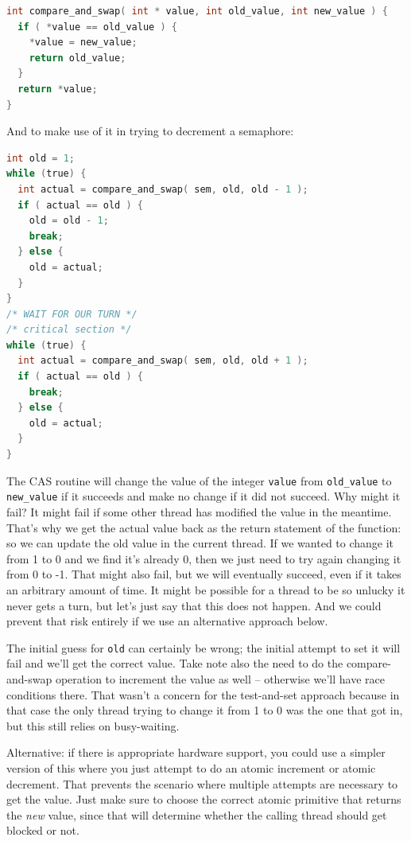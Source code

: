 \begin{lstlisting}[language=C]
int compare_and_swap( int * value, int old_value, int new_value ) {
  if ( *value == old_value ) {
    *value = new_value;
    return old_value;
  }
  return *value;
}
\end{lstlisting}

And to make use of it in trying to decrement a semaphore:

\begin{lstlisting}[language=C]
int old = 1;
while (true) {
  int actual = compare_and_swap( sem, old, old - 1 );
  if ( actual == old ) {
    old = old - 1;
    break;
  } else {
    old = actual;
  }
}
/* WAIT FOR OUR TURN */
/* critical section */
while (true) {
  int actual = compare_and_swap( sem, old, old + 1 );
  if ( actual == old ) {
    break;
  } else {
    old = actual;
  }
}
\end{lstlisting}

The CAS routine will change the value of the integer \texttt{value} from \texttt{old\_value} to \texttt{new\_value} if it succeeds and make no change if it did not succeed. Why might it fail? It might fail if some other thread has modified the value in the meantime. That's why we get the actual value back as the return statement of the function: so we can update the old value in the current thread. If we wanted to change it from 1 to 0 and we find it's already 0, then we just need to try again changing it from 0 to -1. That might also fail, but we will eventually succeed, even if it takes an arbitrary amount of time. It might be possible for a thread to be so unlucky it never gets a turn, but let's just say that this does not happen. And we could prevent that risk entirely if we use an alternative approach below.

The initial guess for \texttt{old} can certainly be wrong; the initial attempt to set it will fail and we'll get the correct value. Take note also the need to do the compare-and-swap operation to increment the value as well -- otherwise we'll have race conditions there. That wasn't a concern for the test-and-set approach because in that case the only thread trying to change it from 1 to 0 was the one that got in, but this still relies on busy-waiting.

Alternative: if there is appropriate hardware support, you could use a simpler version of this where you just attempt to do an atomic increment or atomic decrement. That prevents the scenario where multiple attempts are necessary to get the value. Just make sure to choose the correct atomic primitive that returns the \textit{new} value, since that will determine whether the calling thread should get blocked or not. 


